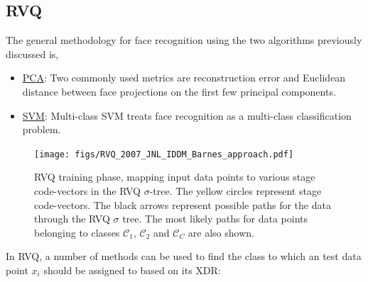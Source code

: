 \subsection{RVQ}
\label{subsec:RVQ}
The general methodology for face recognition using the two algorithms previously discussed is,

\begin{itemize}
\item \underline{PCA}: Two commonly used metrics are reconstruction error and Euclidean distance between face projections on the first few principal components.
\item \underline{SVM}: Multi-class SVM treats face recognition as a multi-class classification problem.  
\end{itemize}
								\begin{figure}[t]
								\centering
								\texttt{[image: figs/RVQ\_2007\_JNL\_IDDM\_Barnes\_approach.pdf]}
								\caption{RVQ training phase, mapping input data points to various stage code-vectors in the RVQ $\sigma$-tree.  The yellow circles represent stage code-vectors.  The black arrows represent possible paths for the data through the RVQ $\sigma$ tree.  The most likely paths for data points belonging to classes $\mathcal{C}_1$, $\mathcal{C}_2$ and $\mathcal{C}_C$ are also shown.}
								\label{fig:RVQ_2007_JNL_IDDM_Barnes_approach}
								\end{figure}



In RVQ, a number of methods can be used to find the class to which an test data point $x_i$ should be assigned to based on its XDR:


